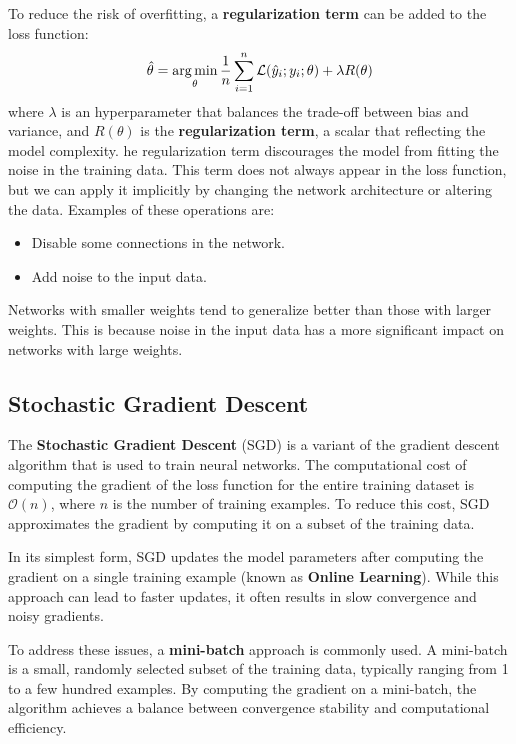 To reduce the risk of overfitting, a \textbf{regularization term} can be added
to the loss function:
\begin{equation}
    \hat{\theta} = \operatorname*{arg\,min}_{\theta} \frac{1}{n} \sum_{i=1}^n \mathcal{L}(\hat{y}_i; y_i; \theta)
    + \lambda R(\theta)
\end{equation}
where $\lambda$ is an hyperparameter that balances the trade-off between bias and
variance, and $R(\theta)$ is the \textbf{regularization term}, a scalar that
reflecting the model complexity. he regularization term discourages the model from
fitting the noise in the training data. This term does not always appear in the
loss function, but we can apply it implicitly by changing the network architecture
or altering the data. Examples of these operations are:
\begin{itemize}
    \item Disable some connections in the network.
    \item Add noise to the input data.
\end{itemize}
\begin{note}
    Networks with smaller weights tend to generalize better than those with larger
    weights. This is because noise in the input data has a more significant impact
    on networks with large weights.
\end{note}
\subsection{Stochastic Gradient Descent}
The \textbf{Stochastic Gradient Descent} (SGD) is a variant of the gradient descent
algorithm that is used to train neural networks. The computational cost of computing
the gradient of the loss function for the entire training dataset is $\mathcal{O}(n)$,
where $n$ is the number of training examples. To reduce this cost, SGD approximates
the gradient by computing it on a subset of the training data.

In its simplest form, SGD updates the model parameters after computing the gradient
on a single training example (known as \textbf{Online Learning}). While this approach
can lead to faster updates, it often results in slow convergence and noisy gradients.

To address these issues, a \textbf{mini-batch} approach is commonly used. A mini-batch
is a small, randomly selected subset of the training data, typically ranging from
1 to a few hundred examples. By computing the gradient on a mini-batch, the
algorithm achieves a balance between convergence stability and computational
efficiency.

